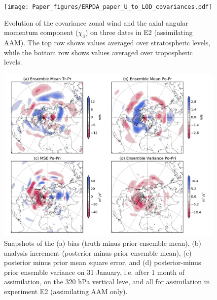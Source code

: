  \begin{figure}
	 \texttt{[image: Paper\_figures/ERPDA\_paper\_U\_to\_LOD\_covariances.pdf]}
	 \caption{Evolution of the covariance zonal wind and the axial angular momentum component ($\chi_3$) on three dates in E2 (assimilating AAM). The top row shows values averaged over stratospheric levels, while the bottom row shows values averaged over tropospheric levels.}
 \label{fig:covariances}
\end{figure}

 \begin{figure}
	 \includegraphics[width=\textwidth]{Paper_figures/ERPDA_paper_U_priorerror_vs_increment_vs_ER_31jan.pdf}
	 \caption{Snapshots of the (a) bias (truth minus prior ensemble mean), (b) analysis increment (posterior minus prior ensemble mean), (c) posterior minus prior mean square error, and (d) posterior-minus prior ensemble variance on 31 January, i.e. after 1 month of assimilation, on the 320 hPa vertical leve, and all for assimilation in experiment E2 (assimilating AAM only). } 
 \label{fig:error_increments}
\end{figure}


